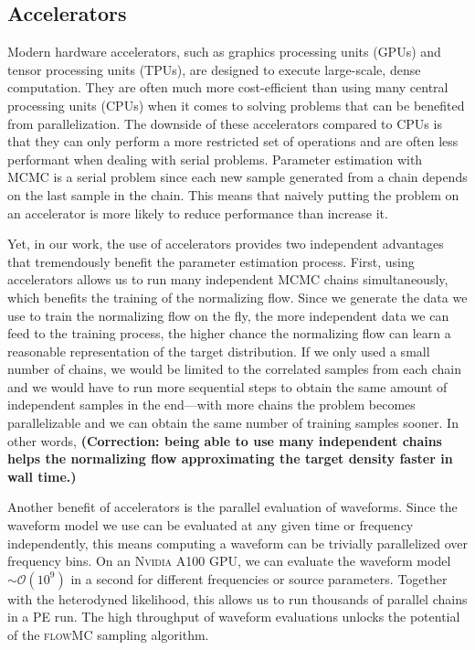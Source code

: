 \documentclass[twocolumn]{aastex631}
\newcommand{\corr}[1]{\textbf{\color{pyRed}(Correction: #1)}}
\begin{document}
\subsection{Accelerators}
\label{sec:accelerators}

Modern hardware accelerators, such as graphics processing units (GPUs) and
tensor processing units (TPUs), are designed to execute large-scale, dense
computation. They are often much more cost-efficient than using many central
processing units (CPUs) when it comes to solving problems that can be benefited
from parallelization.  The downside of these accelerators compared to CPUs is
that they can only perform a more restricted set of operations and are often
less performant when dealing with serial problems. Parameter estimation with
MCMC is a serial problem since each new sample generated from a chain depends
on the last sample in the chain. This means that naively putting the problem on
an accelerator is more likely to reduce performance than increase it.

Yet, in our work, the use of accelerators provides two independent advantages
that tremendously benefit the parameter estimation process. First, using
accelerators allows us to run many independent MCMC chains simultaneously, which
benefits the training of the normalizing flow. Since we generate the data we use
to train the normalizing flow on the fly, the more independent data we can feed
to the training process, the higher chance the normalizing flow can learn a
reasonable representation of the target distribution.  If we only used a small
number of chains, we would be limited to the correlated samples from each chain
and we would have to run more sequential steps to obtain the same amount of
independent samples in the end---with more chains the problem becomes
parallelizable and we can obtain the same number of training samples sooner. In
other words, \corr{being able to use many independent chains helps the normalizing
flow approximating the target density faster in wall time.}

Another benefit of accelerators is the parallel evaluation of waveforms. Since
the waveform model we use can be evaluated at any given time or frequency
independently, this means computing a waveform can be trivially parallelized
over frequency bins. On an \textsc{Nvidia} A100 GPU, we can evaluate the
waveform model $\sim \mathcal{O}(10^9)$ in a second for different
frequencies or source parameters. Together with the heterodyned likelihood, this
allows us to run thousands of parallel chains in a PE run. The high throughput
of waveform evaluations unlocks the potential of the \textsc{flowMC} sampling
algorithm. 
\end{document}
